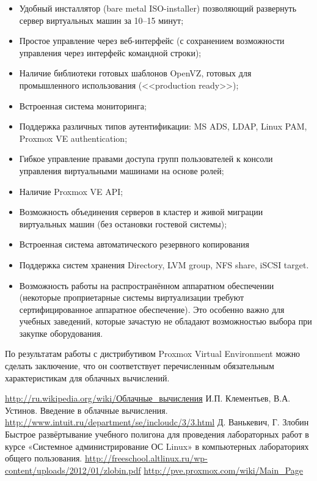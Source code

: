 \documentclass[10pt, a5paper]{article}
\begin{document}
\begin{itemize}
  \item Удобный инсталлятор (bare metal ISO-installer) позволяющий развернуть сервер виртуальных машин за 10--15 минут;
  \item Простое управление через веб-интерфейс (с сохранением возможности управления через интерфейс командной строки);
  \item Наличие библиотеки готовых шаблонов OpenVZ, готовых для промышленного использования (<<production ready>>);
  \item Встроенная система мониторинга;
  \item Поддержка различных типов аутентификации: MS ADS, LDAP, Linux PAM, Proxmox VE authentication;
  \item Гибкое управление правами доступа групп пользователей к консоли управления виртуальными машинами на основе ролей;
  \item Наличие Proxmox VE API;
  \item Возможность объединения серверов в кластер и живой миграции виртуальных машин (без остановки гостевой системы);
  \item Встроенная система автоматического резервного копирования
  \item Поддержка систем хранения Directory, LVM group, NFS share, iSCSI target.
  \item Возможность работы на распространённом аппаратном обеспечении (некоторые проприетарные системы виртуализации требуют сертифицированное аппаратное обеспечение). Это особенно \linebreak важно для учебных заведений, которые зачастую не обладают возможностью выбора при закупке оборудования.
\end{itemize}

По результатам работы с дистрибутивом  Proxmox Virtual \linebreak Environment можно сделать заключение, что он  соответствует перечисленным обязательным характеристикам для облачных вычислений.


\begin{thebibliography}{9}
 \url{http://ru.wikipedia.org/wiki/Облачные\_вычисления}
 И.П. Клементьев, В.А. Устинов. Введение в облачные вычисления. \url{http://www.intuit.ru/department/se/incloudc/3/3.html}
 Д. Ванькевич, Г. Злобин Быстрое развёртывание учебного полигона для проведения лабораторных работ в курсе «Системное администрирование ОС Linux» в компьютерных лабораториях общего пользования. \url{http://freeschool.altlinux.ru/wp-content/uploads/2012/01/zlobin.pdf}
 \url{http://pve.proxmox.com/wiki/Main\_Page}
\end{thebibliography}
\end{document}
